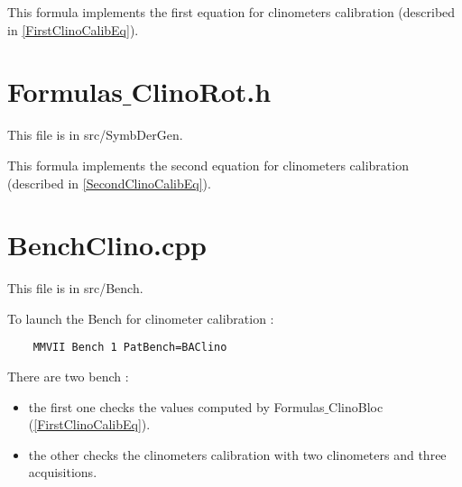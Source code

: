 This formula implements the first equation for clinometers calibration (described in \ref{FirstClinoCalibEq}).


\section{Formulas$\_$ClinoRot.h}

This file is in src/SymbDerGen.

This formula implements the second equation for clinometers calibration (described in \ref{SecondClinoCalibEq}).


\section{BenchClino.cpp}

This file is in src/Bench.

To launch the Bench for clinometer calibration : 
\begin{lstlisting}
    MMVII Bench 1 PatBench=BAClino
\end{lstlisting}

There are two bench :
\begin{itemize}
    \item the first one checks the values computed by Formulas$\_$ClinoBloc (\ref{FirstClinoCalibEq}).
    \item the other checks the clinometers calibration with two clinometers and three acquisitions.
\end{itemize}